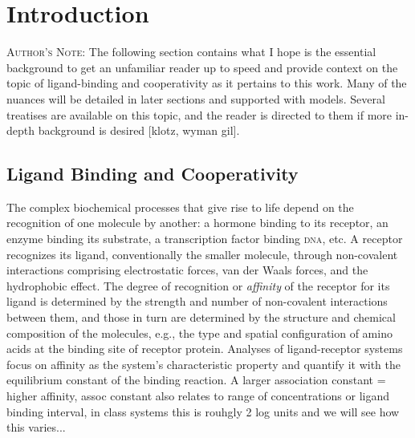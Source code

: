 \documentclass{article}
\numberwithin{equation}{section}
\begin{document}
\renewcommand{\thefootnote}{\fnsymbol{footnote}}

\section{Introduction}

\textsc{Author's Note}: The following section contains what I hope is the essential background to get an unfamiliar reader up to speed and provide context on the topic of ligand-binding and cooperativity as it pertains to this work. Many of the nuances will be detailed in later sections and supported with models. Several treatises are available on this topic, and the reader is directed to them if more in-depth background is desired [klotz, wyman gil].

\subsection*{Ligand Binding and Cooperativity}

The complex biochemical processes that give rise to life depend on the recognition of one molecule by another: a hormone binding to its receptor, an enzyme binding its substrate, a transcription factor binding \textsc{dna}, etc. A receptor recognizes its ligand, conventionally the smaller molecule, through non-covalent interactions comprising electrostatic forces, van der Waals forces, and the hydrophobic effect. The degree of recognition or \emph{affinity} of the receptor for its ligand is determined by the strength and number of non-covalent interactions between them, and those in turn are determined by the structure and chemical composition of the molecules, e.g., the type and spatial configuration of amino acids at the binding site of receptor protein. Analyses of ligand-receptor systems focus on affinity as the system's characteristic property and quantify it with the equilibrium constant of the binding reaction. A larger association constant = higher affinity, assoc constant also relates to range of concentrations or ligand binding interval, in class systems this is rouhgly 2 log units and we will see how this varies...
\end{document}
